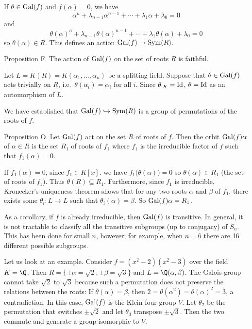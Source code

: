 \proof If $\theta\in \mathop {\rm Gal}(f)$ and $f(\alpha) = 0$, we have
$$\alpha^n + \lambda_{n-1}\alpha^{n-1} + \cdots + \lambda_1\alpha + \lambda_0 = 0$$
and
$$\theta(\alpha)^n + \lambda_{n-1}\theta(\alpha)^{n-1} + \cdots + \lambda_1\theta(\alpha) + \lambda_0 = 0$$
so $\theta(\alpha)\in R$. This defines an action $\mathop {\rm Gal}(f) \to \mathop {\rm Sym}(R)$.\slug

\proclaim Proposition F. The action of $\mathop {\rm Gal}(f)$ on the set of roots $R$ is faithful.

\proof Let $L = K(R) = K(\alpha_1,\ldots,\alpha_n)$ be a splitting field. Suppose that $\theta\in \mathop {\rm Gal}(f)$ acts trivially on $R$, i.e.\ $\theta(\alpha_i) = \alpha_i$ for all $i$. Since $\theta_{|K} = \mathop {\rm Id}$, $\theta = \mathop {\rm Id}$ as an automorphism of $L$.\slug

We have established that $\mathop {\rm Gal}(f) \hookrightarrow \mathop {\rm Sym}(R)$ is a group of permutations of the roots of $f$.

\proclaim Proposition O. Let $\mathop {\rm Gal}(f)$ act on the set $R$ of roots of $f$. Then the orbit $\mathop {\rm Gal}(f)\alpha$ of $\alpha\in R$ is the set $R_1$ of roots of $f_1$ where $f_1$ is the irreducible factor of $f$ such that $f_1(\alpha) = 0$.

\proof If $f_1(\alpha) = 0$, since $f_1\in K[x]$. we have $f_1\big(\theta(\alpha)\big) = 0$ so $\theta(\alpha)\in R_1$ (the set of roots of $f_1$). Thus $\theta(R) \subseteq R_1$. Furthermore, since $f_1$ is irreducible, Kronecker's uniqueness theorem shows that for any two roots $\alpha$ and $\beta$ of $f_1$, there exists some $\theta_i : L\to L$ such that $\theta_i(\alpha) = \beta$. So $\mathop {\rm Gal}(f)\alpha = R_1$.\slug

As a corollary, if $f$ is already irreducible, then $\mathop {\rm Gal}(f)$ is transitive. In general, it is not tractable to classify all the transitive subgroups (up to conjugacy) of $S_n$. This has been done for small $n$, however; for example, when $n = 6$ there are 16 different possible subgroups.

Let us look at an example. Consider $f = (x^2 - 2)(x^2 - 3)$ over the field $K = \Q$. Then $R = \{\pm \alpha = \sqrt 2, \pm \beta = \sqrt 3\}$ and $L = \Q(\alpha, \beta)$. The Galois group cannot take $\sqrt 2$ to $\sqrt 3$ because such a permutation does not preserve the relations between the roots: If $\theta(\alpha) = \beta$, then $2 = \theta(\alpha^2) = \theta(\alpha)^2 = 3$, a contradiction. In this case, $\mathop {\rm Gal}(f)$ is the Klein four-group $V$. Let $\theta_2$ be the permutation that switches $\pm \sqrt 2$ and let $\theta_3$ transpose $\pm \sqrt 3$. Then the two commute and generate a group isomorphic to $V$.


